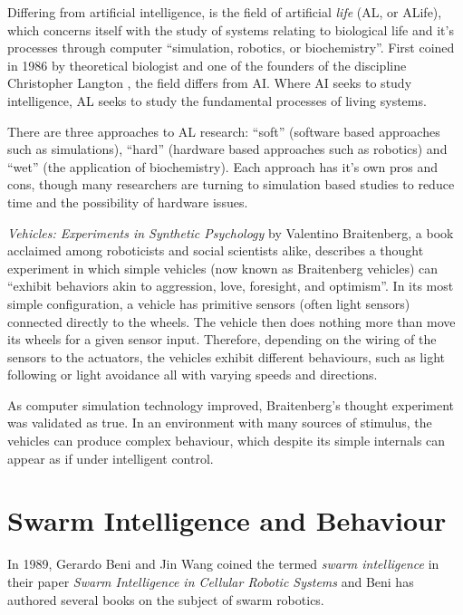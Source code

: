 Differing from artificial intelligence, is the field of artificial \textit{life} (AL, or ALife), which concerns itself with the study of systems relating to biological life and it's processes through computer ``simulation, robotics, or biochemistry''. \cite{artlife} First coined in 1986 by theoretical biologist and one of the founders of the discipline Christopher Langton \cite{langton}, the field differs from AI. Where AI seeks to study intelligence, AL seeks to study the fundamental processes of living systems. 

There are three approaches to AL research: ``soft'' (software based approaches such as simulations), ``hard'' (hardware based approaches such as robotics) and ``wet'' (the application of biochemistry). Each approach has it's own pros and cons, though many researchers are turning to simulation based studies to reduce time and the possibility of hardware issues.

\textit{Vehicles: Experiments in Synthetic Psychology} by Valentino Braitenberg, a book acclaimed among roboticists and social scientists alike, describes a thought experiment in which simple vehicles (now known as Braitenberg vehicles) can ``exhibit behaviors akin to aggression, love, foresight, and optimism''. \cite{braitenberg1986vehicles} In its most simple configuration, a vehicle has primitive sensors (often light sensors) connected directly to the wheels. The vehicle then does nothing more than move its wheels for a given sensor input. Therefore, depending on the wiring of the sensors to the actuators, the vehicles exhibit different behaviours, such as light following or light avoidance all with varying speeds and directions. 

As computer simulation technology improved, Braitenberg's thought experiment was validated as true. In an environment with many sources of stimulus, the vehicles can produce complex behaviour, which despite its simple internals can appear as if under intelligent control.

\section{Swarm Intelligence and Behaviour}

In 1989, Gerardo Beni and Jin Wang coined the termed \textit{swarm intelligence} in their paper \textit{Swarm Intelligence in Cellular Robotic Systems} and Beni has authored several books on the subject of swarm robotics.

